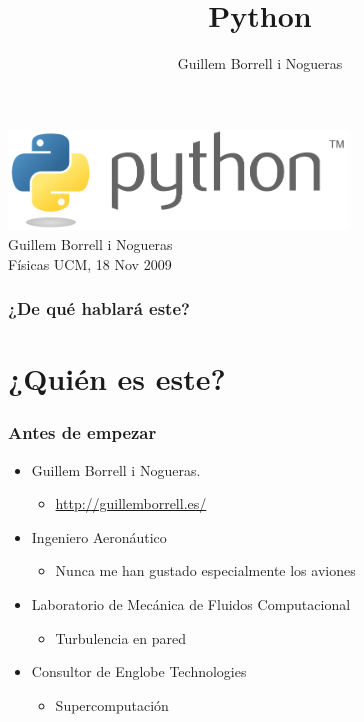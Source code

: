 \documentclass[12pt,mathserif,compress]{beamer}
\title{Python}
\author{Guillem Borrell i Nogueras}
\begin{document}

\begin{frame}
\begin{center}
 \includegraphics[width=9cm]{files/python-logo-generic.pdf}\\
\vspace{1cm}
Guillem Borrell i Nogueras\\

Físicas UCM, 18 Nov 2009
\end{center}
\end{frame}

\begin{frame}
  \frametitle{¿De qué hablará este?}
  \tableofcontents
\end{frame}
\section{¿Quién es este?}
\begin{frame}
  \frametitle{Antes de empezar}
  \begin{itemize}
  \item Guillem Borrell i Nogueras.
    \begin{itemize}
    \item  \url{http://guillemborrell.es/}
    \end{itemize}
  \item Ingeniero Aeronáutico
    \begin{itemize}
    \item Nunca me han gustado especialmente los aviones
    \end{itemize}
  \item Laboratorio de Mecánica de Fluidos Computacional
    \begin{itemize}
    \item Turbulencia en pared
    \end{itemize}
  \item Consultor de Englobe Technologies
    \begin{itemize}
    \item Supercomputación
    \end{itemize}
  \end{itemize}
\end{frame}
\end{document}
